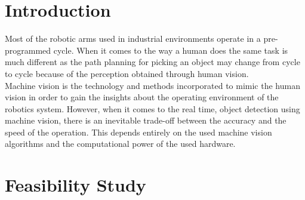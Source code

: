 \documentclass[a4paper,11pt]{article}%
\begin{document}
	

\tableofcontents
\pagebreak





\section{Introduction}
Most of the robotic arms used in industrial environments operate in a pre-programmed cycle. When it comes to the way a human does the same task is much different as the path planning for picking an object may change from cycle to cycle because of the perception obtained through human vision.\\ 

Machine vision is the technology and methods incorporated to mimic the human vision in order to gain the insights about the operating environment of the robotics system. However, when it comes to the real time, object detection using machine vision, there is an inevitable trade-off between the accuracy and the speed of the operation. This depends entirely on the used machine vision algorithms and the computational power of the used hardware.

\section{Feasibility Study}
%
%

\end{document}
